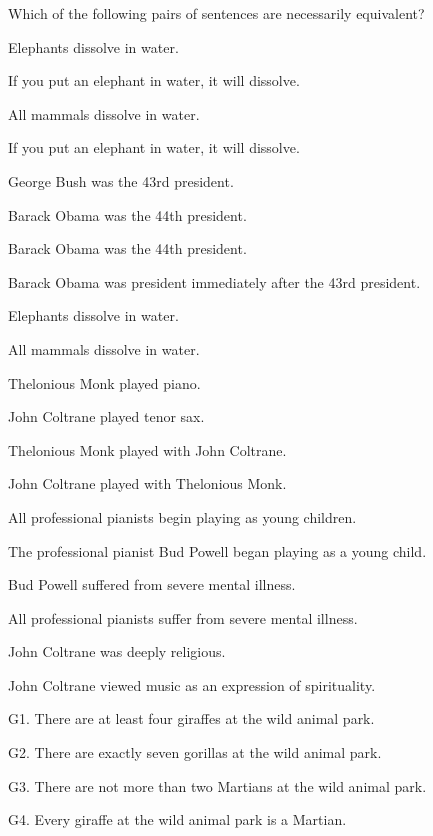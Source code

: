 \problempart Which of the following pairs of sentences are necessarily  equivalent? 
\begin{earg}
\item Elephants dissolve in water.
\item[]	If you put an elephant in water, it will dissolve.\smallskip
\item All mammals dissolve in water.
\item[]	If you put an elephant in water, it will dissolve.\smallskip 
\item George Bush was the 43rd president. 
\item[]	Barack Obama was the 44th president.\smallskip 
\item Barack Obama was the 44th president.
\item[]	Barack Obama was president immediately after the 43rd president.\smallskip 
\item Elephants dissolve in water. 
\item[]	All mammals dissolve in water.\smallskip

\item  Thelonious Monk played piano.
	\item[]	John Coltrane played tenor sax.\smallskip 
\item  Thelonious Monk played with John Coltrane.
	\item[]	John Coltrane played with Thelonious Monk.\smallskip
\item  All professional pianists begin playing as young children.
	\item[]	The professional pianist Bud Powell began playing as a young child.\smallskip
\item  Bud Powell suffered from severe mental illness.
	\item[]	All professional pianists suffer from severe mental illness.\smallskip
\item John Coltrane was deeply religious.	
\item[]	John Coltrane viewed music as an expression of spirituality. 
\end{earg}

\problempart  
\begin{earg}%
\item[G1.] \label{itm:at_least_four}There are at least four giraffes at the wild animal park.
\item[G2.] \label{itm:exactly_seven} There are exactly seven gorillas at the wild animal park.
\item[G3.] \label{itm:not_more_than_two} There are not more than two Martians at the wild animal park.
\item[G4.] \label{itm:martians} Every giraffe at the wild animal park is a Martian.
\end{earg}

